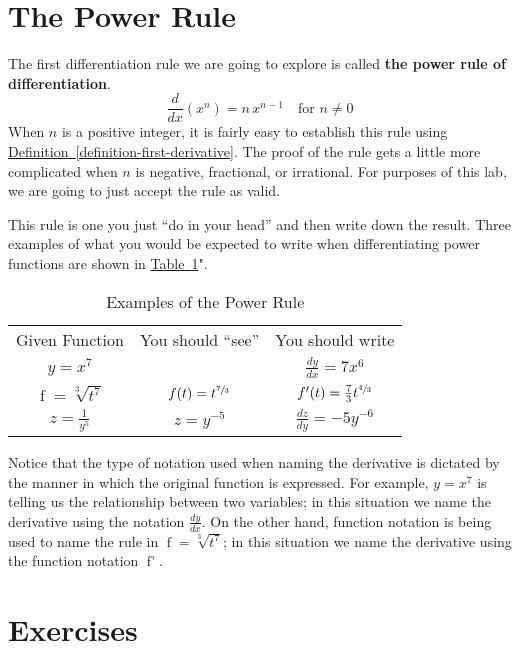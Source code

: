 \documentclass[12pt,]{book}
\newcommand{\terminology}[1]{\textbf{#1}}
\theoremstyle{plain}
\theoremstyle{definition}
\numberwithin{equation}{section}
\newcommand{\hrulemedium}{\noalign{\hrule height 0.07em}}
\newcommand{\hrulethick} {\noalign{\hrule height 0.11em}}
\newcommand{\fe}[2]{\mathop{{#1}{\left(#2\right)}}}
\newcommand{\fd}[1]{#1'}
\newcommand{\lz}[2]{\frac{d#1}{d#2}}
\newcommand{\lzoo}[2]{{\frac{d}{d#1}}{\left(#2\right)}}
\begin{document}
\section[The Power Rule]{The Power Rule}\label{section-power-rule}
The first differentiation rule we are going to explore is called \terminology{the power rule of differentiation}. \begin{equation}\lzoo{x}{x^n}=n\,x^{n-1}\quad\text{for }n\neq0\label{men-2}\end{equation} When \(n\) is a positive integer, it is fairly easy to establish this rule using \hyperref[definition-first-derivative]{Definition~\ref*{definition-first-derivative}}.  The proof of the rule gets a little more complicated when \(n\) is negative, fractional, or irrational.  For purposes of this lab, we are going to just accept the rule as valid.%
\par
This rule is one you just ``do in your head'' and then write down the result.  Three examples of what you would be expected to write when differentiating power functions are shown in \hyperref[table-power-rule]{Table~\ref*{table-power-rule}}".%
\begin{table}
\centering
\caption{Examples of the Power Rule\label{table-power-rule}}
\begin{tabular}{ccc}\hrulethick
Given Function&You should ``see''&You should write\\\hrulemedium
\(y=x^7\)&&\(\lz{y}{x}=7x^6\)\\
\(\fe{f}{t}=\sqrt[3]{t^7}\)&\(\fe{f}{t}=t^{\sfrac{7}{3}}\)&\(\fe{\fd{f}}{t}=\frac{7}{3}t^{\sfrac{4}{3}}\)\\
\(z=\frac{1}{y^5}\)&\(z=y^{-5}\)&\(\lz{z}{y}=-5y^{-6}\)
\end{tabular}
\end{table}
\par
Notice that the type of notation used when naming the derivative is dictated by the manner in which the original function is expressed.  For example, \(y=x^7\) is telling us the relationship between two variables; in this situation we name the derivative using the notation \(\lz{y}{x}\).  On the other hand, function notation is being used to name the rule in \(\fe{f}{t}=\sqrt[3]{t^7}\); in this situation we name the derivative using the function notation \(\fe{\fd{f}}{t}\).%
\typeout{************************************************}
\typeout{************************************************}
\section*{Exercises}\label{exercises-31}
\end{document}
